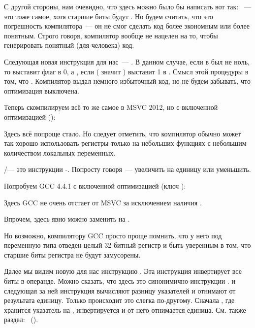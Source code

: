 С другой стороны, нам очевидно, что здесь можно было бы написать вот так: 
~--- это тоже самое, хотя старшие биты \EAX будут . 
Но будем считать, что это погрешность компилятора~--- 
он не смог сделать код более экономным или более понятным. 
Строго говоря, компилятор вообще не нацелен на то, чтобы генерировать понятный (для человека) код.

Следующая новая инструкция для нас~--- \SETNZ. В данном случае, если в \AL был не ноль, 
то  выставит флаг \ZF в 0, а \SETNZ, если  
( значит ) выставит 1 в \AL. 
Смысл этой процедуры в том, что 
 .
Компилятор выдал немного избыточный код, но не будем забывать, что оптимизация выключена.

\label{strlen_MSVC_Ox}

Теперь скомпилируем всё то же самое в MSVC 2012, но с включенной оптимизацией (\Ox):



Здесь всё попроще стало. Но следует отметить, что компилятор обычно может так хорошо использовать регистры 
только на небольших функциях с небольшим количеством локальных переменных.

\INC/\DEC --- это инструкции -. Попросту говоря~--- 
увеличить на единицу или уменьшить.




Попробуем GCC 4.4.1 с включенной оптимизацией (ключ \Othree):



Здесь GCC не очень отстает от MSVC за исключением наличия \MOVZX. 

Впрочем, \MOVZX здесь явно можно заменить на .

Но возможно, компилятору GCC просто проще помнить, что у него под переменную типа \Tchar отведен целый 
32-битный регистр \EDX и быть уверенным в том, что старшие биты регистра не будут замусорены.

\label{strlen_NOT_ADD}
Далее мы видим новую для нас инструкцию \NOT. Эта инструкция инвертирует все биты в операнде. 
Можно сказать, что здесь это синонимично инструкции . 
\NOT и следующая за ней инструкция \ADD вычисляют разницу указателей и отнимают от результата единицу. 
Только происходит это слегка по-другому. Сначала \ECX, где хранится указатель на , 
инвертируется и от него отнимается единица.
См. также раздел: \q{\SignedNumbersSectionName}~().

